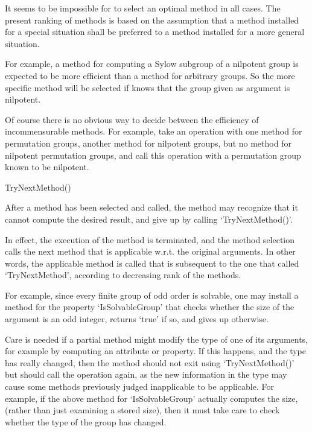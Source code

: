 It seems to be impossible for {\GAP} to select an optimal
method in all cases.
The present ranking of methods is based on the assumption
that a method installed for a special situation shall be preferred
to a method installed for a more general situation.

For example, a method for computing a Sylow subgroup of a nilpotent
group is expected to be more efficient than a method for arbitrary
groups.
So the more specific method will be selected if {\GAP} knows that the
group given as argument is nilpotent.

Of course there is no obvious way to decide between the efficiency of
incommensurable methods.
For example, take an operation with one method for permutation groups,
another method for nilpotent groups,
but no method for nilpotent permutation groups,
and call this operation with a permutation group known to be
nilpotent.


\>TryNextMethod()

After a method has been selected and called,
the method may recognize that it cannot compute the desired result,
and give up by calling `TryNextMethod()'.

In effect, the execution of the method is terminated,
and the method selection calls the next method that is applicable w.r.t.
the original arguments.
In other words, the applicable method is called that is subsequent to the
one that called `TryNextMethod',
according to decreasing rank of the methods.

For example, since every finite group of odd order is solvable,
one may install a method for the property `IsSolvableGroup' that checks
whether the size of the argument is an odd integer,
returns `true' if so,
and gives up otherwise.

Care is  needed  if a  partial  method  might  modify the  type of  one  of its
arguments, for example by computing an attribute  or property. If this happens,
and the type  has   really changed, then  the  method  should not  exit   using
`TryNextMethod()' but  should call the operation again,  as the new information
in the type may   cause  some methods  previously   judged inapplicable to   be
applicable. For  example, if  the  above method  for `IsSolvableGroup' actually
computes the size, (rather than  just examining  a  stored size), then it  must
take care to check whether the type of the group has changed.


